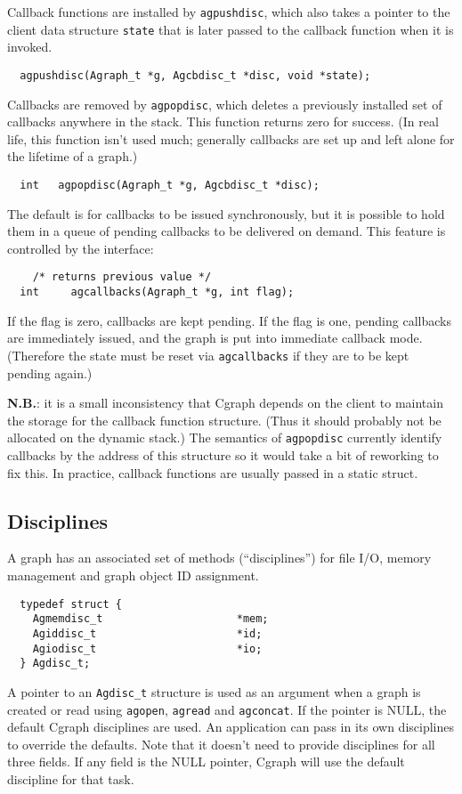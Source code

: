 \documentclass[11pt,letterpaper]{article}
\begin{document}
Callback functions are installed by \verb"agpushdisc", which also takes
a pointer to the client data structure \verb"state" that is
later passed to the callback function when it is invoked.

\begin{verbatim}
  agpushdisc(Agraph_t *g, Agcbdisc_t *disc, void *state);
\end{verbatim}

Callbacks are removed by \verb"agpopdisc", which deletes a
previously installed set of callbacks anywhere in the stack.
This function returns zero for success.  (In real life, this
function isn't used much; generally callbacks are set up and
left alone for the lifetime of a graph.)

\begin{verbatim}
  int   agpopdisc(Agraph_t *g, Agcbdisc_t *disc);
\end{verbatim}

The default is for callbacks to be issued synchronously, but it is 
possible to hold them in a queue of pending callbacks to be delivered
on demand.  This feature is controlled by the interface:

\begin{verbatim}
    /* returns previous value */
  int     agcallbacks(Agraph_t *g, int flag); 
\end{verbatim}

If the flag is zero, callbacks are kept pending. 
If the flag is one, pending callbacks are immediately issued,
and the graph is put into immediate callback mode.
(Therefore the state must be reset via \verb"agcallbacks"
if they are to be kept pending again.)

{\bf N.B.}: it is a small inconsistency that Cgraph depends on the client
to maintain the storage for the callback function structure.
(Thus it should probably not be allocated on the dynamic stack.)
The semantics of \verb"agpopdisc" currently identify callbacks by
the address of this structure so it would take a bit of reworking
to fix this.  In practice, callback functions are usually passed
in a static struct.

\subsection{Disciplines}
\label{subsec:disciplines}
A graph has an associated set of methods (``disciplines'')
for file I/O, memory management and graph object ID assignment.
\begin{verbatim}
  typedef struct {   
    Agmemdisc_t                     *mem;
    Agiddisc_t                      *id;
    Agiodisc_t                      *io;
  } Agdisc_t;
\end{verbatim}
A pointer to an \verb"Agdisc_t" structure is used as an argument when
a graph is created or read using \verb"agopen",
\verb"agread" and \verb"agconcat". If the pointer is NULL, the default
Cgraph disciplines are used. An application can pass in its own disciplines
to override the defaults. Note that it doesn't need to provide disciplines for
all three fields. If any field is the NULL pointer, Cgraph will use the default
discipline for that task.
\end{document}

